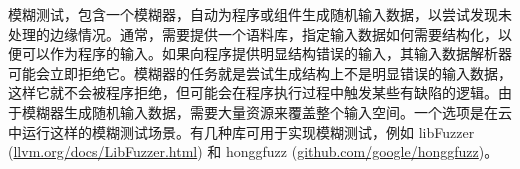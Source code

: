 
模糊测试，包含一个模糊器，自动为程序或组件生成随机输入数据，以尝试发现未处理的边缘情况。通常，需要提供一个语料库，指定输入数据如何需要结构化，以便可以作为程序的输入。如果向程序提供明显结构错误的输入，其输入数据解析器可能会立即拒绝它。模糊器的任务就是尝试生成结构上不是明显错误的输入数据，这样它就不会被程序拒绝，但可能会在程序执行过程中触发某些有缺陷的逻辑。由于模糊器生成随机输入数据，需要大量资源来覆盖整个输入空间。一个选项是在云中运行这样的模糊测试场景。有几种库可用于实现模糊测试，例如 libFuzzer (\url{llvm.org/docs/LibFuzzer.html}) 和 honggfuzz (\url{github.com/google/honggfuzz})。
